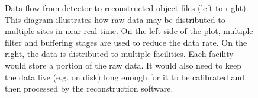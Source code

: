\begin{figure}[hbt!]
 \begin{center}
  \caption[Example of federated processing of data in near real-time using multiple sites.]{\label{fig:federated_offsite_example} Data flow from detector to reconstructed object files (left to right). This diagram illustrates how raw data may be distributed to multiple sites in near-real time. On the left side of the plot, multiple filter and buffering stages are used to reduce the data rate. On the right, the data is distributed to multiple facilities.
  Each facility would store a portion of the raw data. It would also need to keep the data live (e.g. on disk) long enough for it to be calibrated and then processed by the reconstruction software.}
 \end{center}
\end{figure}

